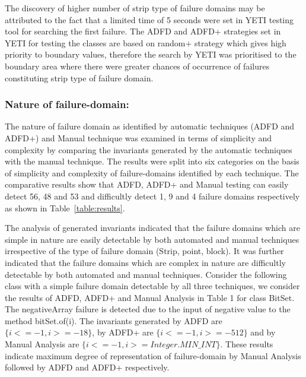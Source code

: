 The discovery of higher number of strip type of failure domains may be attributed to the fact that a limited time of 5 seconds were set in YETI testing tool for searching the first failure. The ADFD and ADFD+ strategies set in YETI for testing the classes are based on random+ strategy which gives high priority to boundary values, therefore the search by YETI was prioritised to the boundary area where there were greater chances of occurrence of failures constituting strip type of failure domain.


\subsubsection{Nature of failure-domain:}
The nature of failure domain as identified by automatic techniques (ADFD and ADFD+) and Manual technique was examined in terms of simplicity and complexity by comparing the invariants generated by the automatic techniques with the manual technique. The results were split into six categories on the basis of simplicity and complexity of failure-domains identified by each technique. The comparative results show that ADFD, ADFD+ and Manual testing can easily detect 56, 48 and 53 and difficultly detect 1, 9 and 4 failure domains respectively as shown in Table~\ref{table:results}.

The analysis of generated invariants indicated that the failure domains which are simple in nature are easily detectable by both automated and manual techniques irrespective of the type of failure domain (Strip, point, block). It was further indicated that the failure domains which are complex in nature are difficultly detectable by both automated and manual techniques. %
Consider the following class with a simple failure domain detectable by all three techniques, we consider the results of ADFD, ADFD+ and Manual Analysis in Table 1 for class BitSet. The negativeArray failure is detected due to the input of negative value to the method bitSet.of(i). The invariants generated by ADFD are $\{i <= -1, i >= -18\}$, by ADFD+ are $\{i <= -1, i >= -512\}$ and by Manual Analysis are $\{i <= -1, i >= Integer.MIN\_INT\}$. These results indicate maximum degree of representation of failure-domain by Manual Analysis followed by ADFD and ADFD+ respectively.

